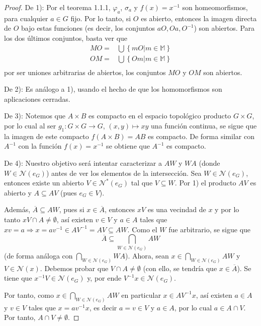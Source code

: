 \documentclass[12pt]{report}
\theoremstyle{largebreak}
\newcommand{\cf}[3]{\ensuremath{#1:#2\rightarrow#3}}
\newcommand{\N}[1]{\ensuremath{\mathscr{N}(#1)}}
\newcommand{\Ns}[1]{\ensuremath{\mathscr{N}^*(#1)}}
\begin{document}
    \begin{proof}
        De 1): Por el teorema 1.1.1, $\varphi_a$, $\sigma_a$ y $f(x)=x^{-1}$ son homeomorfismos, para cualquier $a\in G$ fijo. Por lo tanto, si $O$ es abierto, entonces la imagen directa de $O$ bajo estas funciones (es decir, los conjuntos $aO, Oa, O^{-1}$) son abiertos. Para los dos últimos conjuntos, basta ver que
        \begin{equation*}
            \begin{split}
                MO =& \bigcup\left\{mO\big|m\in\mathbb{M} \right\}\\
                OM =& \bigcup\left\{Om\big|m\in\mathbb{M} \right\}\\
            \end{split}
        \end{equation*}
        por ser uniones arbitrarias de abiertos, los conjuntos $MO$ y $OM$ son abiertos.

        De 2): Es análogo a 1), usando el hecho de que los homomorfismos son aplicaciones cerradas.

        De 3): Notemos que $A\times B$ es compacto en el espacio topológico producto $G\times G$, por lo cual al ser $\cf{g_1}{G\times G}{G}$, $(x,y)\mapsto xy$ una función continua, se sigue que la imagen de este compacto $f(A\times B) = AB$ es compacto. De forma similar con $A^{-1}$ con la función $f(x)=x^{-1}$ se obtiene que $A^{-1}$ es compacto.

        De 4): Nuestro objetivo será intentar caracterizar a $AW$ y $WA$ (donde $W\in\N{e_G}$) antes de ver los elementos de la intersección. Sea $W\in\N{e_G}$, entonces existe un abierto $V\in\Ns{e_G}$ tal que $V\subseteq W$. Por 1) el producto $AV$ es abierto y $A\subseteq AV$ (pues $e_G\in V$).

        Además, $\overline{A}\subseteq AW$, pues si $x\in\overline{A}$, entonces $xV$ es una vecindad de $x$ y por lo tanto $xV\cap A\neq\emptyset$, así existen $v\in V$ y $a\in A$ tales que $xv=a\Rightarrow x=av^{-1}\in AV^{-1}=AV\subseteq AW$. Como el $W$ fue arbitrario, se sigue que
        \begin{equation*}
            \overline{A}\subseteq\bigcap_{W\in\N{e_G}}AW
        \end{equation*} 
        (de forma análoga con $\bigcap_{W\in\N{e_G}}WA$). Ahora, sean $x\in\bigcap_{W\in\N{e_G}}AW$ y $V\in\N{x}$. Debemos probar que $V\cap A\neq\emptyset$ (con ello, se tendría que $x\in\overline{A}$). Se tiene que $x^{-1}V\in\N{e_G}$ y, por ende $V^{-1}x\in\N{e_G}$.

        Por tanto, como $x\in\bigcap_{W\in\N{e_G}}AW$ en particular $x\in AV^{-1}x$, así existen $a\in A$ y $v\in V$ tales que $x=av^{-1}x$, es decir $a=v\in V$ y $a\in A$, por lo cual $a\in A\cap V$. Por tanto, $A\cap V\neq\emptyset$.
    \end{proof}
\end{document}
